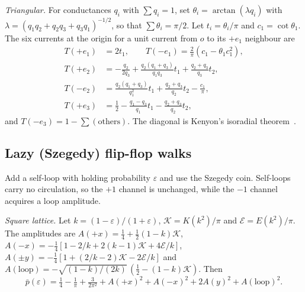 \documentclass[aps,pra,10pt,twocolumn,superscriptaddress,nofootinbib]{revtex4-2}
\newcommand{\pbar}{\bar{p}}
\begin{document}
\emph{Triangular.} For conductances $q_i$ with $\sum q_i=1$, set
$\theta_i=\arctan(\lambda q_i)$ with $\lambda=(q_1q_2+q_2q_3+q_3q_1)^{-1/2}$, so that $\sum\theta_i=\pi/2$.
Let $t_i=\theta_i/\pi$ and $c_1=\cot\theta_1$. The six currents at the origin for a unit
current from $o$ to its $+e_1$ neighbour are
\begin{align}
T(+e_1)&=2t_1,\qquad T(-e_1)=\tfrac2\pi(c_1-\theta_1c_1^2),\nonumber\\
T(+e_2)&=-\tfrac{q_2}{2q_3}+\tfrac{q_2(q_1+q_3)}{q_1q_3}t_1+\tfrac{q_2+q_3}{q_3}t_2,\nonumber\\
T(-e_2)&=\tfrac{q_2(q_1+q_3)}{q_1^2}t_1+\tfrac{q_2+q_3}{q_2}t_2-\tfrac{c_1}{\pi},\nonumber\\
T(+e_3)&=\tfrac12-\tfrac{q_1-q_3}{q_1}t_1-\tfrac{q_2+q_3}{q_2}t_2,
\end{align}
and $T(-e_3)=1-\sum(\text{others})$. The diagonal is Kenyon's isoradial theorem~\cite{Kenyon2002}.

\subsection{Lazy (Szegedy) flip-flop walks}
\label{sec:lazy}

Add a self-loop with holding probability $\varepsilon$ and use the Szegedy coin. Self-loops
carry no circulation, so the $+1$ channel is unchanged, while the $-1$ channel acquires a
loop amplitude.

\emph{Square lattice.} Let $k=(1-\varepsilon)/(1+\varepsilon)$, $\mathcal K=K(k^2)/\pi$ and
$\mathcal E=E(k^2)/\pi$. The amplitudes are
$A(+x)=\tfrac14+\tfrac12(1-k)\mathcal K$,
$A(-x)=-\tfrac14[1-2/k+2(k-1)\mathcal K+4\mathcal E/k]$,
$A(\pm y)=-\tfrac14[1+(2/k-2)\mathcal K-2\mathcal E/k]$ and
$A(\text{loop})=-\sqrt{(1-k)/(2k)}\,(\tfrac12-(1-k)\mathcal K)$. Then
\begin{equation}
\pbar(\varepsilon)=\tfrac14-\tfrac1\pi+\tfrac3{2\pi^2}+A(+x)^2+A(-x)^2+2A(y)^2+A(\text{loop})^2 .
\end{equation}
\end{document}
